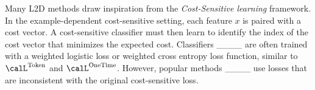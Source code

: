 Many L2D methods draw inspiration from the \textit{Cost-Sensitive learning} framework. In the example-dependent cost-sensitive setting, each feature $x$ is paired with a cost vector. A cost-sensitive classifier must then learn to identify the index of the cost vector that minimizes the expected cost. Classifiers ____ are often trained with a weighted logistic loss or weighted cross entropy loss function, similar to $\calL^{\text{Token}}$ and $\calL^{\text{OneTime}}$. However, popular methods ____ use losses that are inconsistent with the original cost-sensitive loss.
